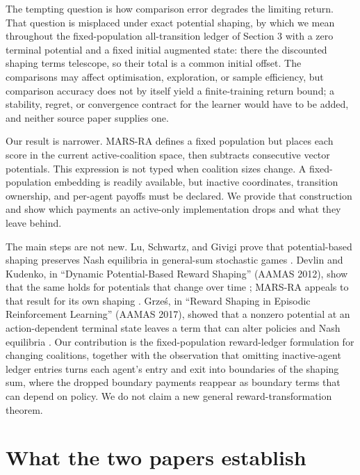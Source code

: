 \documentclass{article}
\begin{document}
The tempting question is how comparison error degrades the limiting return. That question is misplaced under exact potential shaping, by which we mean throughout the fixed-population all-transition ledger of Section 3 with a zero terminal potential and a fixed initial augmented state: there the discounted shaping terms telescope, so their total is a common initial offset. The comparisons may affect optimisation, exploration, or sample efficiency, but comparison accuracy does not by itself yield a finite-training return bound; a stability, regret, or convergence contract for the learner would have to be added, and neither source paper supplies one.

Our result is narrower. MARS-RA defines a fixed population but places each score in the current active-coalition space, then subtracts consecutive vector potentials. This expression is not typed when coalition sizes change. A fixed-population embedding is readily available, but inactive coordinates, transition ownership, and per-agent payoffs must be declared. We provide that construction and show which payments an active-only implementation drops and what they leave behind.

The main steps are not new. Lu, Schwartz, and Givigi prove that potential-based shaping preserves Nash equilibria in general-sum stochastic games \cite{lu2011policy}. Devlin and Kudenko, in ``Dynamic Potential-Based Reward Shaping'' (AAMAS 2012), show that the same holds for potentials that change over time \cite{devlin2012dynamic}; MARS-RA appeals to that result for its own shaping \cite{wang2026marsra}. Grze\'s, in ``Reward Shaping in Episodic Reinforcement Learning'' (AAMAS 2017), showed that a nonzero potential at an action-dependent terminal state leaves a term that can alter policies and Nash equilibria \cite{grzes2017reward}. Our contribution is the fixed-population reward-ledger formulation for changing coalitions, together with the observation that omitting inactive-agent ledger entries turns each agent's entry and exit into boundaries of the shaping sum, where the dropped boundary payments reappear as boundary terms that can depend on policy. We do not claim a new general reward-transformation theorem.

\section{What the two papers establish}
\end{document}
